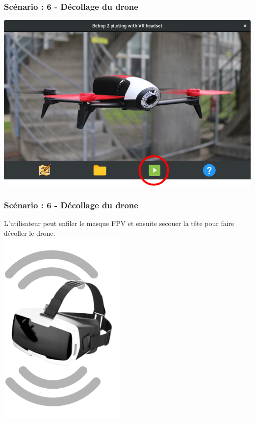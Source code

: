 \documentclass{beamer}
\begin{document}
	\begin{frame}
		\begin{center}
		\frametitle{Scénario : 6 - Décollage du drone}

        \includegraphics[scale=0.4]{startFlight.png}
		\end{center}
	\end{frame}
	


	\begin{frame}
		\begin{center}
		\frametitle{Scénario : 6 - Décollage du drone}
        L'utilisateur peut enfiler le masque FPV et ensuite secouer la tête pour faire décoller le drone.\\
        \includegraphics[scale=0.4]{shake.png}
		\end{center}
	\end{frame}
	
\end{document}
